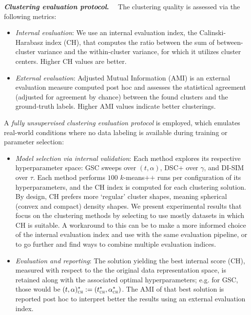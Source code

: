 \documentclass[10pt]{article} %
\makeatletter
\newcommand{\GSC}{GSC\xspace}
\newcommand{\inlinetitle}[2]{\noindent\textbf{\textit{#1}{#2}}~~}
\newcommand{\eg}   			{e.g.\@\xspace}
\makeatother
\begin{document}
\inlinetitle{Clustering evaluation protocol}{.}%
The clustering quality is assessed via the following metrics:
\begin{itemize}[leftmargin=1.4em, topsep=-0.2em, itemsep=-0.5em]
  \item \emph{Internal evaluation}: We use an internal evaluation index, the Calinski-Harabasz index (CH), that computes the ratio between the sum of between-cluster variance and the within-cluster variance, for which it utilizes cluster centers. Higher CH values are better.
	\item \emph{External evaluation}: Adjusted Mutual Information (AMI) \citep{strehl2002cluster} is an external evaluation measure computed post hoc and assesses the statistical agreement (adjusted for agreement by chance) between the found clusters and the ground-truth labels. Higher AMI values indicate better clusterings.
\end{itemize}

A \emph{fully unsupervised clustering evaluation protocol} is employed, which emulates real-world conditions where no data labeling is available during training or parameter selection:
\begin{itemize}[leftmargin=1.4em, topsep=-0.2em, itemsep=-0.3em]
\item \emph{Model selection via internal validation}: Each method explores its respective hyperparameter space: \GSC sweeps over $(t, \alpha)$, DSC+ over $\gamma$, and DI-SIM over $\tau$. Each method performs $100$ $k$-means$\texttt{++}$ runs per configuration of its hyperparameters, and the CH index is computed for each clustering solution.
By design, CH prefers more `regular' cluster shapes, meaning spherical (convex and compact) density shapes.
We present experimental results that focus on the clustering methods %
by selecting to use mostly datasets in which CH is suitable.
A workaround to this can be to make a more informed choice of the internal evaluation index and use with the same evaluation pipeline, or to go further and find ways to combine multiple evaluation indices.

\item \emph{Evaluation and reporting}: The solution yielding the best internal score (CH), measured with respect to the the original data representation space, is retained along with the associated optimal hyperparameters; \eg for \GSC, those would be $(t,\alpha)^*_{\textsc{\tiny CH}} := (t^*_{\textsc{\tiny CH}},\alpha^*_{\textsc{\tiny CH}})$. The AMI of that best solution is reported post hoc to interpret better the results using an external evaluation index.
\end{itemize}
\end{document}
